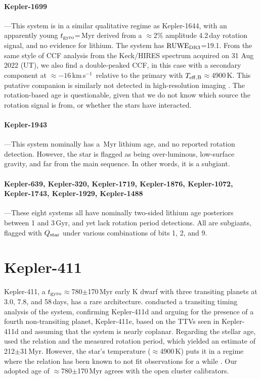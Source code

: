 \documentclass[11pt,twocolumn,tighten,linenumbers]{aastex63}
\newcommand{\kms}{{km\,s$^{-1}$}}
\begin{document}
\paragraph{Kepler-1699}---This system is in a similar qualitative
regime as Kepler-1644, with an apparently young $t_{\rm
gyro}$=\kepsixteenninenine\,Myr derived from a $\approx$2\% amplitude
4.2\,day rotation signal, and no evidence for lithium.  The system has
${\rm RUWE}_{\rm DR3}$=19.1.  From the same style of CCF analysis from
the Keck/HIRES spectrum acquired on 31 Aug 2022 (UT), we also find a
double-peaked CCF, in this case with a secondary component at
$\approx$$-16$\,\kms\ relative to the primary with $T_{\rm
eff,B}$$\approx$4900\,K.  This putative companion is similarly not
detected in high-resolution imaging \citep{2017AJ....153...66Z}.  The
rotation-based age is questionable, given that we do not know which
source the rotation signal is from, or whether the stars have
interacted.

\paragraph{Kepler-1943}---This system nominally has a
\kepnineteenfourthree\,Myr lithium age, and no reported rotation
detection.  However, the star is flagged as being over-luminous,
low-surface gravity, and far from the main sequence.  In other words,
it is a subgiant.

\paragraph{Kepler-639, Kepler-320, Kepler-1719, Kepler-1876,
Kepler-1072, Kepler-1743, Kepler-1929, Kepler-1488}---These eight
systems all have nominally two-sided lithium age posteriors between 1
and 3\,Gyr, and yet lack rotation period detections.  All are
subgiants, flagged with $Q_{\rm star}$ under various combinations of
bits 1, 2, and 9.


\section{Kepler-411}

Kepler-411, a $t_{\rm gyro}$$\approx$780$\pm$170\,Myr early K dwarf
with three transiting planets at 3.0, 7.8, and 58\,days, has a rare
architecture.  \citet{2019A&A...624A..15S} conducted a transiting
timing analysis of the system, confirming Kepler-411d and arguing for
the presence of a fourth non-transiting planet, Kepler-411e, based on
the TTVs seen in Kepler-411d and assuming that the system is nearly
coplanar.  Regarding the stellar age, \citet{2019A&A...624A..15S} used
the \citet{2007ApJ...669.1167B} relation and the measured rotation
period, which yielded an estimate of 212$\pm$31\,Myr.  However, the
star's temperature ($\approx$4900\,K) puts it in a regime where the
\citeauthor{2007ApJ...669.1167B} relation has been known to not fit
observations for a while \citep[e.g.][Fig.~9]{Mamajek_2008}.  Our
adopted age of $\approx$780$\pm$170\,Myr agrees with the open cluster
calibrators.
\end{document}
